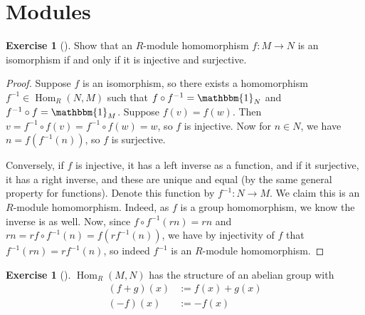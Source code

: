 \documentclass[reqno]{amsart}
\theoremstyle{definition}
\newtheorem{exercise}[theorem]{Exercise}
\theoremstyle{remark}
\DeclareMathOperator{\Hom}{Hom}
\begin{document}
\section{Modules}
    \begin{exercise}[]
        Show that an $R$-module homomorphism
        $f \colon M \to N$ is an isomorphism if and
        only if it is injective and surjective.
    \end{exercise}

    \begin{proof}
        Suppose $f$ is an isomorphism, so
        there exists a homomorphism
        $f^{-1} \in \Hom_{R}(N,M)$ such that
        $f \circ f^{-1} = \mathbbm{1}_{N}$ and
        $f^{-1} \circ f = \mathbbm{1}_{M}$.
        Suppose $f(v) = f(w)$. Then
        $v = f^{-1} \circ f(v) = 
        f^{-1} \circ f(w) = w$, so $f$ is injective.
        Now for $ n\in N$, we have
        $n = f \left( f^{-1}(n) \right) $, so
        $f$ is surjective.

        Conversely, if $f$ is  injective, it has
        a left inverse as a function, and if it surjective, it
        has a right inverse, and these are unique and equal (by
        the same general property for functions). 
        Denote this function by $f^{-1} \colon
        N \to M$. We claim this is an
        $R$-module homomorphism. Indeed, as
        $f$ is a group homomorphism, we know the
        inverse is as well. 
        Now, since 
        $f \circ f^{-1}(rn) = rn$ and
        $rn = r f \circ f^{-1}(n) =
        f \left( r f^{-1}(n) \right) $, we have
        by injectivity of $f$ that
        $f^{-1}(rn) = r f^{-1}(n)$, so
        indeed $f^{-1}$ is an $R$-module homomorphism.
    \end{proof}

    \begin{exercise}[]
        $\Hom_{R} (M,N)$ has the structure of an abelian group
        with
        \begin{align*}
            \left( f+g \right) (x) 
            &:= f(x) + g(x)\\
            (-f) (x) 
            &:= - f(x)
        \end{align*}
    \end{exercise}
\end{document}
